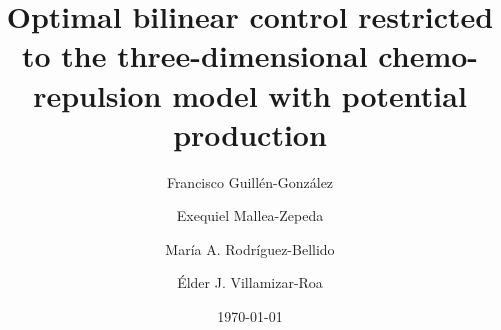 \documentclass[11pt,reqno]{amsart}%
\numberwithin{equation}{section}
\begin{document}
\title[ ]{Optimal bilinear control restricted to the three-dimensional chemo-repulsion model with potential production}
\author[F. Guill\'en-Gonz\'alez]{Francisco Guill\'en-Gonz\'alez}
\address[F. Guill\'en-Gonz\'alez]{Universidad de Sevilla, Dpto. de Ecuaciones Diferenciales y An\'alisis Num\'erico and IMUS, C/Tarfia, S/N, 41012, Sevilla, Spain.}
\author[E. Mallea-Zepeda]{Exequiel Mallea-Zepeda}
\address[E. Mallea-Zepeda]{Universidad  Cat\'olica del Norte, Departamento de
Matem\'{a}ticas, Av. Angamos, 0610, Antofagasta, Chile.} 
\author[M. A. Rodr\'iguez-Bellido]{Mar\'ia A. Rodr\'iguez-Bellido }
\address[M.A. Rodr\'iguez-Bellido]{Universidad de Sevilla, Dpto. de Ecuaciones Diferenciales y An\'alisis Num\'erico and IMUS, C/Tarfia, S/N, 41012, Sevilla, Spain.}
\author[E.J. Villamizar-Roa]{\'Elder J. Villamizar-Roa}
\address[E.J. Villamizar-Roa]{Universidad Industrial de Santander, Escuela de
Matem\'{a}ticas, A.A. 678, Bucaramanga, Colombia.} 
\date{\today}

  
\end{document}
